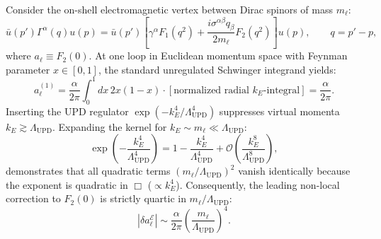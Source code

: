 \documentclass[11pt,a4paper]{article}
\begin{document}
Consider the on-shell electromagnetic vertex between Dirac spinors of mass $m_\ell$:
\begin{equation}
\bar{u}(p')\Gamma^\alpha(q)u(p) = \bar{u}(p')\left[\gamma^\alpha F_1(q^2) + \frac{i\sigma^{\alpha\beta}q_\beta}{2m_\ell} F_2(q^2)\right]u(p), \qquad q = p' - p,
\end{equation}
where $a_\ell \equiv F_2(0)$. At one loop in Euclidean momentum space with Feynman parameter $x \in [0,1]$, the standard unregulated Schwinger integrand yields:
\begin{equation}
a_\ell^{(1)} = \frac{\alpha}{2\pi}\int_0^1 dx\,2x(1-x) \cdot \left[\text{normalized radial } k_E\text{-integral}\right] = \frac{\alpha}{2\pi}.
\end{equation}
Inserting the UPD regulator $\exp(-k_E^4/\Lambda_{\mathrm{UPD}}^4)$ suppresses virtual momenta $k_E \gtrsim \Lambda_{\mathrm{UPD}}$. Expanding the kernel for $k_E \sim m_\ell \ll \Lambda_{\mathrm{UPD}}$:
\begin{equation}
\exp\!\left(-\frac{k_E^4}{\Lambda_{\mathrm{UPD}}^4}\right) = 1 - \frac{k_E^4}{\Lambda_{\mathrm{UPD}}^4} + \mathcal{O}\!\left(\frac{k_E^8}{\Lambda_{\mathrm{UPD}}^8}\right),
\end{equation}
demonstrates that all quadratic terms $(m_\ell/\Lambda_{\mathrm{UPD}})^2$ vanish identically because the exponent is quadratic in $\Box$ ($\propto k_E^4$). Consequently, the leading non-local correction to $F_2(0)$ is strictly quartic in $m_\ell/\Lambda_{\mathrm{UPD}}$:
\begin{equation}
\left|\delta a_\ell^{\mathcal{E}}\right| \sim \frac{\alpha}{2\pi}\left(\frac{m_\ell}{\Lambda_{\mathrm{UPD}}}\right)^4.
\end{equation}
\end{document}
